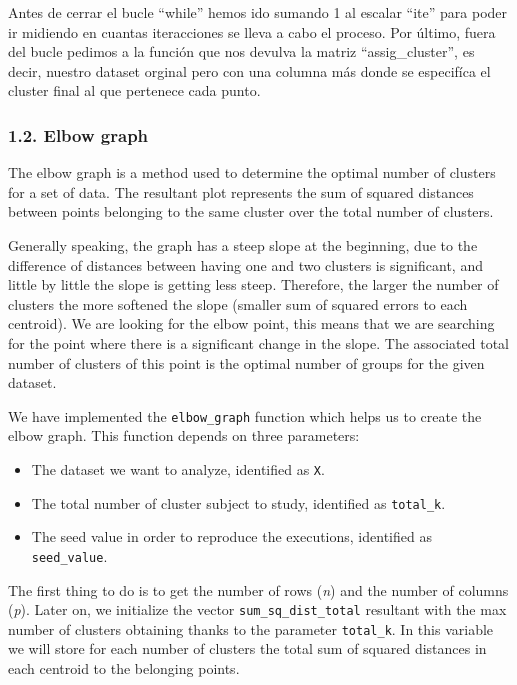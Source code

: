 \documentclass[
]{article}
\providecommand{\tightlist}{%
  \setlength{\itemsep}{0pt}\setlength{\parskip}{0pt}}
\begin{document}
Antes de cerrar el bucle ``while'' hemos ido sumando 1 al escalar
``ite'' para poder ir midiendo en cuantas iteracciones se lleva a cabo
el proceso. Por último, fuera del bucle pedimos a la función que nos
devulva la matriz ``assig\_cluster'', es decir, nuestro dataset orginal
pero con una columna más donde se especifíca el cluster final al que
pertenece cada punto.

\hypertarget{elbow-graph}{%
\subsubsection{1.2. Elbow graph}\label{elbow-graph}}

The elbow graph is a method used to determine the optimal number of
clusters for a set of data. The resultant plot represents the sum of
squared distances between points belonging to the same cluster over the
total number of clusters.

Generally speaking, the graph has a steep slope at the beginning, due to
the difference of distances between having one and two clusters is
significant, and little by little the slope is getting less steep.
Therefore, the larger the number of clusters the more softened the slope
(smaller sum of squared errors to each centroid). We are looking for the
elbow point, this means that we are searching for the point where there
is a significant change in the slope. The associated total number of
clusters of this point is the optimal number of groups for the given
dataset.

We have implemented the \texttt{elbow\_graph} function which helps us to
create the elbow graph. This function depends on three parameters:

\begin{itemize}
\tightlist
\item
  The dataset we want to analyze, identified as \texttt{X}.
\item
  The total number of cluster subject to study, identified as
  \texttt{total\_k}.
\item
  The seed value in order to reproduce the executions, identified as
  \texttt{seed\_value}.
\end{itemize}

The first thing to do is to get the number of rows (\emph{n}) and the
number of columns (\emph{p}). Later on, we initialize the vector
\texttt{sum\_sq\_dist\_total} resultant with the max number of clusters
obtaining thanks to the parameter \texttt{total\_k}. In this variable we
will store for each number of clusters the total sum of squared
distances in each centroid to the belonging points.
\end{document}
